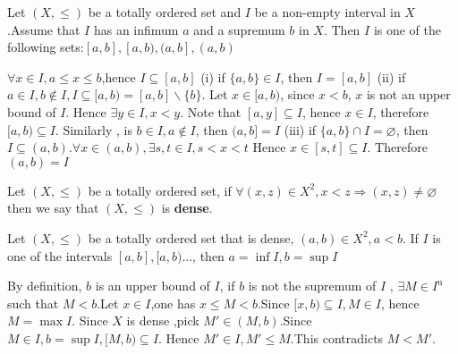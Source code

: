 \documentclass{book}
\begin{document}
\begin{propositionenv}
   Let $(X,\le )$ be a totally ordered set and $I $ be a  non-empty interval in $X$  .Assume that $I$ has an infimum $a$ and a supremum $b$ in $X$. Then $I$ is one of the following sets:$[a,b],[a,b),(a,b],(a,b)$
\end{propositionenv}
\begin{proofenv}
    $\forall x\in I ,a\le x\le b $,hence $I\subseteq [a,b]$
    \newline
    (i) if $\{a,b\}\in I$, then $I=[a,b]$
    \newline
    (ii) if $a\in I, b\notin I,I\subseteq[a,b)=[a,b]\backslash\{b\}$. Let $x\in [a,b)$, since $x<b$, $x$ is not an upper bound of $I$. Hence $\exists y\in I, x<y$. Note that $[a,y]\subseteq I$, hence $x\in I$, therefore $[a,b)\subseteq I$. Similarly , is $b\in I,a\notin I$, then $(a,b]=I$
    \newline
    (iii) if $\{a,b\}\cap I=\varnothing$, then $I\subseteq(a,b) .\forall x\in (a,b),\exists s,t\in I,s<x<t$ Hence $x\in [s,t]\subseteq I$. Therefore $(a,b)=I$

\end{proofenv}
\begin{definitionenv}[Dense]
    Let $(X,\le )$ be a totally ordered set, if $\forall (x,z)\in X^2,x<z\Rightarrow (x,z)\not=\varnothing$ then we say that $(X,\le)$ is \textbf{dense}.
\end{definitionenv}
\begin{propositionenv}
    Let $(X,\le )$ be a totally ordered set that is dense, $(a,b)\in X^2,a<b$. If $I$ is one of the intervals $[a,b],[a,b)\dots$, then $a=\inf I,b=\sup I$
\end{propositionenv}
\begin{proofenv}
    By definition, $b$ is an upper bound of $I$, if $b$ is not the supremum of $I$ , $\exists M\in I^\mathrm{u}$ such that $M<b$.Let $x\in I$,one has $x\le M <b$.Since $[x,b)\subseteq I,M\in I$, hence $M=\max I$. Since $X$ is dense ,pick $M'\in (M,b)$.Since $M\in I,b=\sup I,[M,b)\subseteq I$. Hence $M'\in I,M'\le M$.This contradicts $M<M'$.
\end{proofenv}
\end{document}
